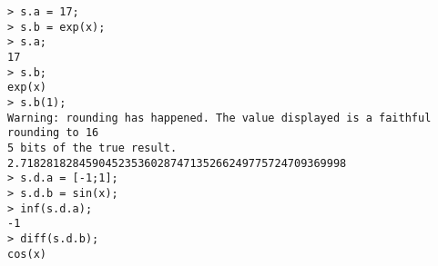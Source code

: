 \begin{center}\begin{minipage}{15cm}\begin{Verbatim}[frame=single]
> s.a = 17;
> s.b = exp(x);
> s.a;
17
> s.b;
exp(x)
> s.b(1);
Warning: rounding has happened. The value displayed is a faithful rounding to 16
5 bits of the true result.
2.71828182845904523536028747135266249775724709369998
> s.d.a = [-1;1];
> s.d.b = sin(x);
> inf(s.d.a);
-1
> diff(s.d.b);
cos(x)
\end{Verbatim}
\end{minipage}\end{center}
